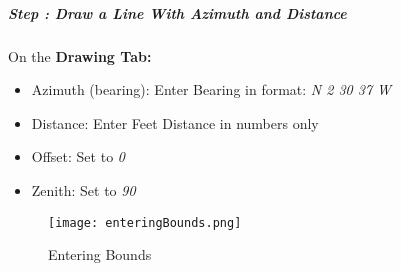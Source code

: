 
\subparagraph*{{\LARGE Step \thestepCount:} Draw a Line With Azimuth and Distance}
\vspace{.2in}

On the \textbf{Drawing Tab:}
\begin{itemize}
\item Azimuth (bearing): Enter Bearing in format:\emph{ N 2 30 37 W}
\item Distance: Enter Feet Distance in numbers only
\item Offset: Set to \emph{0}
\item Zenith: Set to \emph{90}
\end{itemize}
\begin{figure}[H]
\centering
    \texttt{[image: enteringBounds.png]}
\vspace{-.1in}

\caption{Entering Bounds}
\end{figure}

\clearpage


